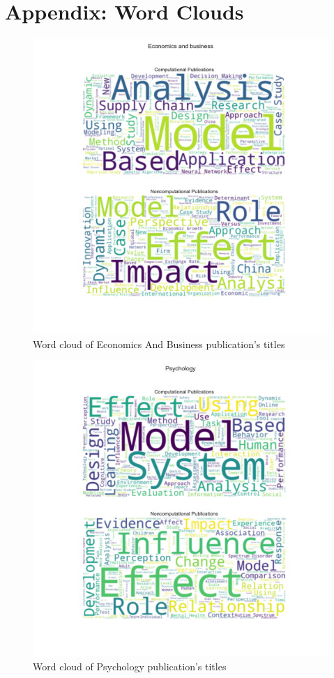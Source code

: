 \documentclass[12pt, a4paper]{article}
\begin{document}
\section{Appendix: Word Clouds}\label{appendix}
\begin{figure}[ht]
	\centering
	\includegraphics[width=\textwidth]{wc_Economics_And_Business}
	\caption{Word cloud of Economics And Business publication's titles}
\end{figure}
\begin{figure}[ht]
	\centering
	\includegraphics[width=\textwidth]{wc_Psychology}
	\caption{Word cloud of Psychology publication's titles}
\end{figure}
\end{document}
